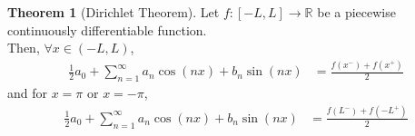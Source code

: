 \documentclass[fleqn, a4paper, 12pt, twoside]{article}
\theoremstyle{definition}
\theoremstyle{theorem}
\newtheorem{theorem}{Theorem}
\begin{document}
\begin{theorem}[Dirichlet Theorem]
	Let $f : [-L,L] \to \mathbb{R}$ be a piecewise continuously differentiable function.\\
	Then, $\forall x \in (-L,L)$,
	\begin{align*}
		\frac{1}{2} a_0 + \sum\limits_{n = 1}^{\infty} a_n \cos(n x) + b_n \sin(n x) &= \frac{f(x^-) + f(x^+)}{2}
	\end{align*}
	and for $x = \pi$ or $x = -\pi$,
	\begin{align*}
		\frac{1}{2} a_0 + \sum\limits_{n = 1}^{\infty} a_n \cos(n x) + b_n \sin(n x) &= \frac{f(L^-) + f(-L^+)}{2}
	\end{align*}
	\label{Dirichlet_Theorem}
\end{theorem}
\end{document}
